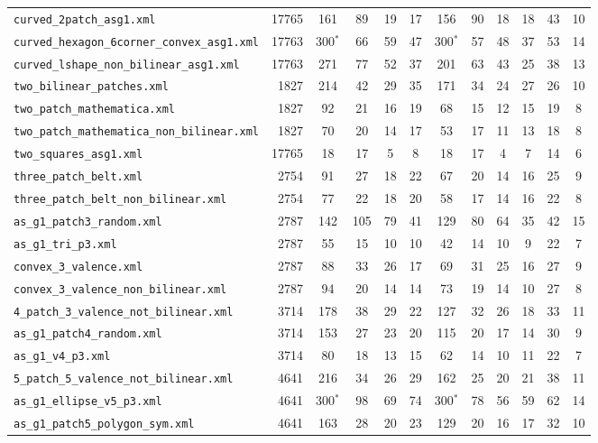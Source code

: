 \documentclass[10pt,a4paper]{article}
\begin{document}
{\begin{longtable}{@{}lrcccccccccc@{}}
\texttt{curved\_2patch\_asg1.xml} & 17765 & 161 & 89 & 19 & 17 & 156 & 90 & 18 & 18 & 43 & 10 \\
\texttt{curved\_hexagon\_6corner\_convex\_asg1.xml} & 17763 & 300$^*$ & 66 & 59 & 47 & 300$^*$ & 57 & 48 & 37 & 53 & 14 \\
\texttt{curved\_lshape\_non\_bilinear\_asg1.xml} & 17763 & 271 & 77 & 52 & 37 & 201 & 63 & 43 & 25 & 38 & 13 \\
\texttt{two\_bilinear\_patches.xml} & 1827 & 214 & 42 & 29 & 35 & 171 & 34 & 24 & 27 & 26 & 10 \\
\texttt{two\_patch\_mathematica.xml} & 1827 & 92 & 21 & 16 & 19 & 68 & 15 & 12 & 15 & 19 & 8 \\
\texttt{two\_patch\_mathematica\_non\_bilinear.xml} & 1827 & 70 & 20 & 14 & 17 & 53 & 17 & 11 & 13 & 18 & 8 \\
\texttt{two\_squares\_asg1.xml} & 17765 & 18 & 17 & 5 & 8 & 18 & 17 & 4 & 7 & 14 & 6 \\
\texttt{three\_patch\_belt.xml} & 2754 & 91 & 27 & 18 & 22 & 67 & 20 & 14 & 16 & 25 & 9 \\
\texttt{three\_patch\_belt\_non\_bilinear.xml} & 2754 & 77 & 22 & 18 & 20 & 58 & 17 & 14 & 16 & 22 & 8 \\
\texttt{as\_g1\_patch3\_random.xml} & 2787 & 142 & 105 & 79 & 41 & 129 & 80 & 64 & 35 & 42 & 15 \\
\texttt{as\_g1\_tri\_p3.xml} & 2787 & 55 & 15 & 10 & 10 & 42 & 14 & 10 & 9 & 22 & 7 \\
\texttt{convex\_3\_valence.xml} & 2787 & 88 & 33 & 26 & 17 & 69 & 31 & 25 & 16 & 27 & 9 \\
\texttt{convex\_3\_valence\_non\_bilinear.xml} & 2787 & 94 & 20 & 14 & 14 & 73 & 19 & 14 & 10 & 27 & 8 \\
\texttt{4\_patch\_3\_valence\_not\_bilinear.xml} & 3714 & 178 & 38 & 29 & 22 & 127 & 32 & 26 & 18 & 33 & 11 \\
\texttt{as\_g1\_patch4\_random.xml} & 3714 & 153 & 27 & 23 & 20 & 115 & 20 & 17 & 14 & 30 & 9 \\
\texttt{as\_g1\_v4\_p3.xml} & 3714 & 80 & 18 & 13 & 15 & 62 & 14 & 10 & 11 & 22 & 7 \\
\texttt{5\_patch\_5\_valence\_not\_bilinear.xml} & 4641 & 216 & 34 & 26 & 29 & 162 & 25 & 20 & 21 & 38 & 11 \\
\texttt{as\_g1\_ellipse\_v5\_p3.xml} & 4641 & 300$^*$ & 98 & 69 & 74 & 300$^*$ & 78 & 56 & 59 & 62 & 14 \\
\texttt{as\_g1\_patch5\_polygon\_sym.xml} & 4641 & 163 & 28 & 20 & 23 & 129 & 20 & 16 & 17 & 32 & 10 \\

\end{longtable}}
\end{document}
